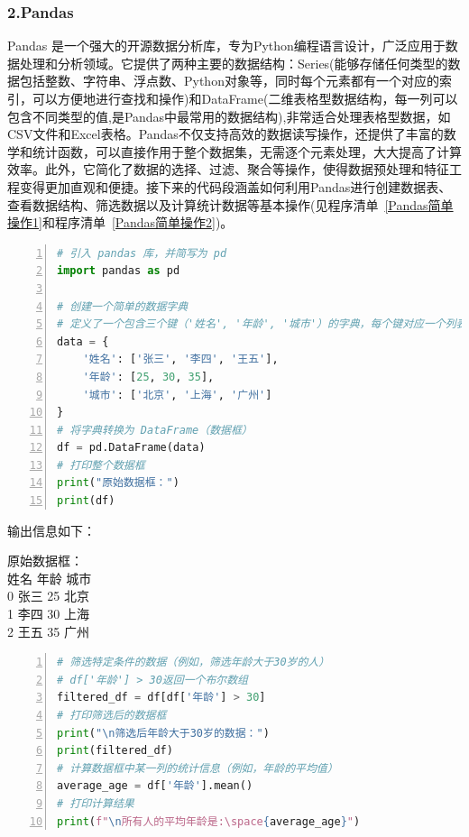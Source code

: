 \subsubsection{2.Pandas}

Pandas 是一个强大的开源数据分析库，专为Python编程语言设计，广泛应用于数据处理和分析领域。它提供了两种主要的数据结构：Series(能够存储任何类型的数据包括整数、字符串、浮点数、Python对象等，同时每个元素都有一个对应的索引，可以方便地进行查找和操作)和DataFrame(二维表格型数据结构，每一列可以包含不同类型的值,是Pandas中最常用的数据结构),非常适合处理表格型数据，如CSV文件和Excel表格。Pandas不仅支持高效的数据读写操作，还提供了丰富的数学和统计函数，可以直接作用于整个数据集，无需逐个元素处理，大大提高了计算效率。此外，它简化了数据的选择、过滤、聚合等操作，使得数据预处理和特征工程变得更加直观和便捷。接下来的代码段涵盖如何利用Pandas进行创建数据表、查看数据结构、筛选数据以及计算统计数据等基本操作(见程序清单~\ref{Pandas简单操作1}和程序清单~\ref{Pandas简单操作2})。

\begin{lstlisting}[language={python},label={Pandas简单操作1},caption={Pandas简单操作1}, basicstyle=\footnotesize\ttfamily, breaklines=true, numbers=left, frame=single]
# 引入 pandas 库，并简写为 pd
import pandas as pd

# 创建一个简单的数据字典
# 定义了一个包含三个键（'姓名', '年龄', '城市'）的字典，每个键对应一个列表，这些列表中的元素分别表示不同人的信息
data = {
    '姓名': ['张三', '李四', '王五'],
    '年龄': [25, 30, 35],
    '城市': ['北京', '上海', '广州']
}
# 将字典转换为 DataFrame（数据框）
df = pd.DataFrame(data)
# 打印整个数据框
print("原始数据框：")
print(df)
\end{lstlisting}

输出信息如下：
\vspace{-3mm} %
\begin{tcolorbox}[colframe=blue!50!black, colback=blue!10!white, coltitle=black, sharp corners, top=0mm, bottom=0mm, boxrule=0.8mm]
原始数据框：\\
   姓名  年龄  城市\\
0  张三  25  北京 \\
1  李四  30  上海 \\
2  王五  35  广州 \\
\end{tcolorbox}
\vspace{-3mm} %

\begin{lstlisting}[language={python},label={Pandas简单操作2},caption={Pandas简单操作2}, basicstyle=\footnotesize\ttfamily, breaklines=true, numbers=left, frame=single]
# 筛选特定条件的数据（例如，筛选年龄大于30岁的人）
# df['年龄'] > 30返回一个布尔数组
filtered_df = df[df['年龄'] > 30]
# 打印筛选后的数据框
print("\n筛选后年龄大于30岁的数据：")
print(filtered_df)
# 计算数据框中某一列的统计信息（例如，年龄的平均值）
average_age = df['年龄'].mean()
# 打印计算结果
print(f"\n所有人的平均年龄是:\space{average_age}")
\end{lstlisting}


